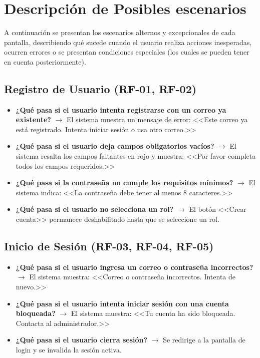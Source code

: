 \documentclass[12pt,a4paper]{article}
\begin{document}
\newpage

\section{Descripción de Posibles escenarios}

A continuación se presentan los escenarios alternos y excepcionales de cada pantalla, describiendo qué sucede cuando el usuario realiza acciones inesperadas, ocurren errores o se presentan condiciones especiales (los cuales se pueden tener en cuenta posteriormente).

\subsection{Registro de Usuario (RF-01, RF-02)}
\begin{itemize}
    \item \textbf{¿Qué pasa si el usuario intenta registrarse con un correo ya existente?} $\rightarrow$ El sistema muestra un mensaje de error: <<Este correo ya está registrado. Intenta iniciar sesión o usa otro correo.>>
    \item \textbf{¿Qué pasa si el usuario deja campos obligatorios vacíos?} $\rightarrow$ El sistema resalta los campos faltantes en rojo y muestra: <<Por favor completa todos los campos requeridos.>>
    \item \textbf{¿Qué pasa si la contraseña no cumple los requisitos mínimos?} $\rightarrow$ El sistema indica: <<La contraseña debe tener al menos 8 caracteres.>>
    \item \textbf{¿Qué pasa si el usuario no selecciona un rol?} $\rightarrow$ El botón <<Crear cuenta>> permanece deshabilitado hasta que se seleccione un rol.
\end{itemize}

\subsection{Inicio de Sesión (RF-03, RF-04, RF-05)}
\begin{itemize}
    \item \textbf{¿Qué pasa si el usuario ingresa un correo o contraseña incorrectos?} $\rightarrow$ El sistema muestra: <<Correo o contraseña incorrectos. Intenta de nuevo.>>
    \item \textbf{¿Qué pasa si el usuario intenta iniciar sesión con una cuenta bloqueada?} $\rightarrow$ El sistema muestra: <<Tu cuenta ha sido bloqueada. Contacta al administrador.>>
    \item \textbf{¿Qué pasa si el usuario cierra sesión?} $\rightarrow$ Se redirige a la pantalla de login y se invalida la sesión activa.
\end{itemize}
\end{document}
